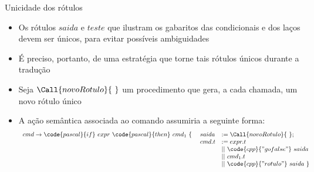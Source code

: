 \begin{frame}[fragile]{Unicidade dos rótulos}

    \begin{itemize}
        \item Os rótulos $saida$ e $teste$ que ilustram os gabaritos das condicionais e dos laços devem ser únicos, para evitar possíveis ambiguidades

        \item É preciso, portanto, de uma estratégia que torne tais rótulos únicos durante a tradução

        \item Seja $\Call{novoRotulo}{\ }$ um procedimento que gera, a cada chamada, um novo rótulo único

        \item A ação semântica associada ao comando  assumiria a seguinte forma:
        \[
            \begin{array}{rll}
            cmd \to \code{pascal}{if}\ expr\ \code{pascal}{then}\ cmd_1 \ \{\ & saida & := \Call{novoRotulo}{\ }; \\
            & cmd.t & := expr.t\ \\ & & ||\ \code{cpp}{"gofalse"}\ saida\ \\ & & ||\ cmd_1.t \\
            & & ||\ \code{cpp}{"rotulo"}\ saida\ \}
            \end{array}
        \]
    \end{itemize}

\end{frame}
